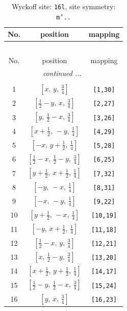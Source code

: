 \documentclass[fleqn,8pt]{jsarticle}
\begin{document}
\renewcommand{\arraystretch}{1.2}
\begin{longtable}{ccc}
\caption{Wyckoff site: {\tt 16l}, site symmetry: {\tt m'..}}
 \\
 \hline \hline
No. & position & mapping \\ \hline \endfirsthead

\multicolumn{2}{l}{\tablename\ \thetable{}} \\
 \hline \hline
No. & position & mapping \\ \hline \endhead

 \hline \hline
\multicolumn{2}{r}{\footnotesize\it continued ...} \\ \endfoot

 \hline \hline
\multicolumn{2}{r}{} \\ \endlastfoot

1 & $\left[ x,\, y,\, \frac{3}{4} \right]$ & {\tt [1,30]} \\ \hline
2 & $\left[ \frac{1}{2} - y,\, x,\, \frac{3}{4} \right]$ & {\tt [2,27]} \\ \hline
3 & $\left[ y,\, \frac{1}{2} - x,\, \frac{3}{4} \right]$ & {\tt [3,26]} \\ \hline
4 & $\left[ x + \frac{1}{2},\, - y,\, \frac{1}{4} \right]$ & {\tt [4,29]} \\ \hline
5 & $\left[ - x,\, y + \frac{1}{2},\, \frac{1}{4} \right]$ & {\tt [5,28]} \\ \hline
6 & $\left[ \frac{1}{2} - x,\, \frac{1}{2} - y,\, \frac{3}{4} \right]$ & {\tt [6,25]} \\ \hline
7 & $\left[ y + \frac{1}{2},\, x + \frac{1}{2},\, \frac{1}{4} \right]$ & {\tt [7,32]} \\ \hline
8 & $\left[ - y,\, - x,\, \frac{1}{4} \right]$ & {\tt [8,31]} \\ \hline
9 & $\left[ - x,\, - y,\, \frac{1}{4} \right]$ & {\tt [9,22]} \\ \hline
10 & $\left[ y + \frac{1}{2},\, - x,\, \frac{1}{4} \right]$ & {\tt [10,19]} \\ \hline
11 & $\left[ - y,\, x + \frac{1}{2},\, \frac{1}{4} \right]$ & {\tt [11,18]} \\ \hline
12 & $\left[ \frac{1}{2} - x,\, y,\, \frac{3}{4} \right]$ & {\tt [12,21]} \\ \hline
13 & $\left[ x,\, \frac{1}{2} - y,\, \frac{3}{4} \right]$ & {\tt [13,20]} \\ \hline
14 & $\left[ x + \frac{1}{2},\, y + \frac{1}{2},\, \frac{1}{4} \right]$ & {\tt [14,17]} \\ \hline
15 & $\left[ \frac{1}{2} - y,\, \frac{1}{2} - x,\, \frac{3}{4} \right]$ & {\tt [15,24]} \\ \hline
16 & $\left[ y,\, x,\, \frac{3}{4} \right]$ & {\tt [16,23]} \\
\end{longtable}
\end{document}
